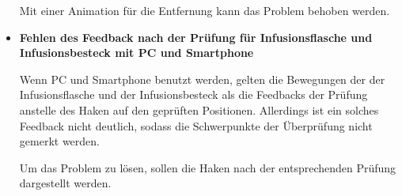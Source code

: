 \begin{itemize}
    Mit einer Animation für die Entfernung kann das Problem behoben werden.
    
    \item \textbf{Fehlen des Feedback nach der Prüfung für Infusionsflasche und Infusionsbesteck mit PC und Smartphone}
    
    Wenn PC und Smartphone benutzt werden, gelten die Bewegungen der der Infusionsflasche und der Infusionsbesteck als die Feedbacks der Prüfung anstelle des Haken auf den geprüften Positionen. Allerdings ist ein solches Feedback nicht deutlich, sodass die Schwerpunkte der Überprüfung nicht gemerkt werden.
    
    Um das Problem zu lösen, sollen die Haken nach der entsprechenden Prüfung dargestellt werden.
\end{itemize}












